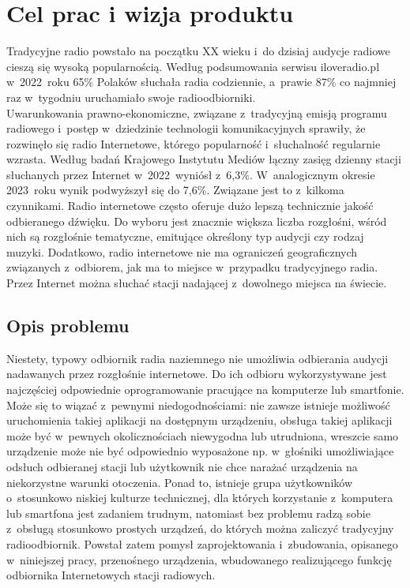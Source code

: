 \documentclass[polish]{aghengthesis}
\author{Norbert Morawski}
\date{\the\year}
\begin{document}
\lstset{inputencoding=utf8, basicstyle=\ttfamily}

\maketitle

\tableofcontents

\cleardoublepage
\chapter{Cel prac i wizja produktu}
	Tradycyjne radio powstało na początku XX wieku i~do dzisiaj audycje radiowe cieszą się wysoką popularnością. Według podsumowania serwisu iloveradio.pl\textsuperscript{\cite{iloveradio_stats}} w~2022~roku 65\% Polaków słuchała radia codziennie, a~prawie 87\% co najmniej raz w~tygodniu uruchamiało swoje radioodbiorniki. 
	$ $\\
	
	Uwarunkowania prawno-ekonomiczne, związane z~tradycyjną emisją programu radiowego i~postęp w~dziedzinie technologii komunikacyjnych sprawiły, że rozwinęło się radio Internetowe, którego popularność i~słuchalność regularnie wzrasta. Według badań Krajowego Instytutu Mediów łączny zasięg dzienny stacji słuchanych przez Internet w~2022~wyniósł z~6,3\%\textsuperscript{\cite{kim_2022}}. W~analogicznym okresie 2023~roku wynik podwyższył się do 7,6\%\textsuperscript{\cite{kim_2023}}.
	Związane jest to z~kilkoma czynnikami. Radio internetowe często oferuje dużo lepszą technicznie jakość odbieranego dźwięku. Do wyboru jest znacznie większa liczba rozgłośni, wśród nich są rozgłośnie tematyczne, emitujące określony typ audycji czy rodzaj muzyki. Dodatkowo, radio internetowe nie ma ograniczeń geograficznych związanych z~odbiorem, jak ma to miejsce w~przypadku tradycyjnego radia. Przez Internet można słuchać stacji nadającej z~dowolnego miejsca na świecie.
	
	\section{Opis problemu}
			Niestety, typowy odbiornik radia naziemnego nie umożliwia odbierania audycji nadawanych przez rozgłośnie internetowe.
			Do ich odbioru wykorzystywane jest najczęściej odpowiednie oprogramowanie pracujące na komputerze lub smartfonie.
			Może się to wiązać z~pewnymi niedogodnościami: nie zawsze istnieje możliwość uruchomienia takiej aplikacji na dostępnym urządzeniu, obsługa takiej aplikacji może być w~pewnych okolicznościach niewygodna lub utrudniona, wreszcie samo urządzenie może nie być odpowiednio wyposażone np. w~głośniki umożliwiające odsłuch odbieranej stacji lub użytkownik nie chce narażać urządzenia na niekorzystne warunki otoczenia. Ponad to, istnieje grupa użytkowników o~stosunkowo niskiej kulturze technicznej, dla których korzystanie z~komputera lub smartfona jest zadaniem trudnym, natomiast bez problemu radzą sobie z~obsługą stosunkowo prostych urządzeń, do których można zaliczyć tradycyjny radioodbiornik. Powstał zatem pomysł zaprojektowania i~zbudowania, opisanego w~niniejszej pracy, przenośnego urządzenia, wbudowanego realizującego funkcję odbiornika Internetowych stacji radiowych.
		
\end{document}

